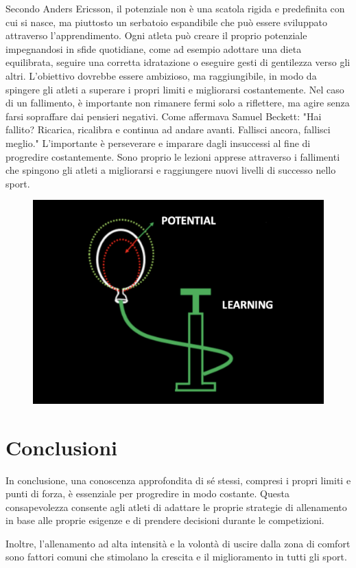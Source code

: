 \documentclass[12pt,oneside,a4paper]{article}
\begin{document}
Secondo Anders Ericsson, il potenziale non è una scatola rigida e predefinita con cui si nasce, ma piuttosto un serbatoio espandibile che può essere sviluppato attraverso l'apprendimento. Ogni atleta può creare il proprio potenziale impegnandosi in sfide quotidiane, come ad esempio adottare una dieta equilibrata, seguire una corretta idratazione o eseguire gesti di gentilezza verso gli altri. L'obiettivo dovrebbe essere ambizioso, ma raggiungibile, in modo da spingere gli atleti a superare i propri limiti e migliorarsi costantemente. 
Nel caso di un fallimento, è importante non rimanere fermi solo a riflettere, ma agire senza farsi sopraffare dai pensieri negativi. Come affermava Samuel Beckett: "Hai fallito? Ricarica, ricalibra e continua ad andare avanti. Fallisci ancora, fallisci meglio." L'importante è perseverare e imparare dagli insuccessi al fine di progredire costantemente. Sono proprio le lezioni apprese attraverso i fallimenti che spingono gli atleti a migliorarsi e raggiungere nuovi livelli di successo nello sport. 
\begin{figure}[h]
    \centering
    \includegraphics[width=.7\textwidth]{pall.png}
    \label{fig:my_label}
\end{figure}


\section{Conclusioni} \label{sec:concl}
In conclusione, una conoscenza approfondita di sé stessi, compresi i propri limiti e punti di forza, è essenziale per progredire in modo costante. Questa consapevolezza consente agli atleti di adattare le proprie strategie di allenamento in base alle proprie esigenze e di prendere decisioni durante le competizioni. 

Inoltre, l'allenamento ad alta intensità e la volontà di uscire dalla zona di comfort sono fattori comuni che stimolano la crescita e il miglioramento in tutti gli sport. 
\end{document}
